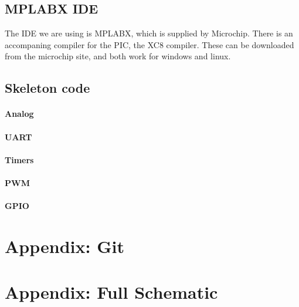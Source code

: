 \documentclass{article}
\begin{document}
\subsection{MPLABX IDE}
The IDE we are using is MPLABX, which is supplied by Microchip. There is an accompaning compiler for the PIC, the XC8 compiler. These can be downloaded from the microchip site, and both work for windows and linux.

\subsection{Skeleton code}
\paragraph{Analog}
\paragraph{UART}
\paragraph{Timers}
\paragraph{PWM}
\paragraph{GPIO}

\section{Appendix: Git}
\section{Appendix: Full Schematic}
\end{document}
